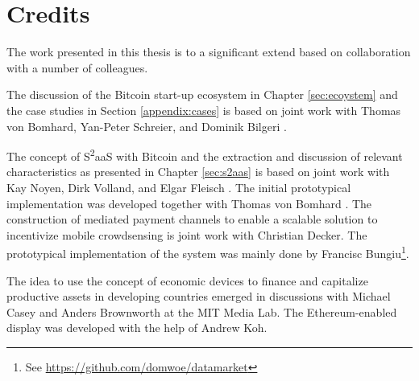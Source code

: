 
\section{Credits}

The work presented in this thesis is to a significant extend based on collaboration with a number of colleagues.

The discussion of the Bitcoin start-up ecosystem in Chapter \ref{sec:ecoystem} and the case studies in Section \ref{appendix:cases} is based on joint work with Thomas von Bomhard, Yan-Peter Schreier, and Dominik Bilgeri \parencite[c.f.]{Worner2016ecis}.

The concept of S\textsuperscript{2}aaS with Bitcoin and the extraction and discussion of relevant characteristics as presented in Chapter \ref{sec:s2aas} is based on joint work with Kay Noyen, Dirk Volland, and Elgar Fleisch \parencite[c.f.]{DBLP:journals/corr/NoyenVWF14}. The initial prototypical implementation was developed together with Thomas von Bomhard \parencite[c.f.]{Worner:2014:YSE:2638728.2638786}.
The construction of mediated payment channels to enable a scalable solution to incentivize mobile crowdsensing is joint work with Christian Decker. The prototypical implementation of the system was mainly done by Francisc Bungiu\footnote{See \url{https://github.com/domwoe/datamarket}}. 

The idea to use the concept of economic devices to finance and capitalize productive assets in developing countries emerged in discussions with Michael Casey and Anders Brownworth at the MIT Media Lab. The Ethereum-enabled display was developed with the help of Andrew Koh. 
